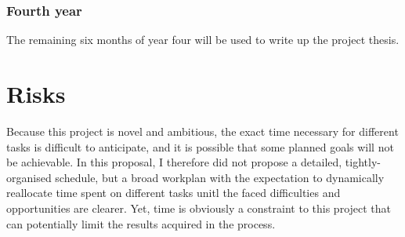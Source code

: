 \documentclass[a4paper,12pt,twoside]{report}
\begin{document}
\subsubsection{Fourth year}

The remaining six months of year four will be used to write up the project thesis. 










\section{Risks}

Because this project is novel and ambitious, the exact time necessary for different tasks is difficult to anticipate, and it is possible that some planned goals will not be achievable. In this proposal, I therefore did not propose a detailed, tightly-organised schedule, but a broad workplan with the expectation to dynamically reallocate time spent on different tasks unitl the faced difficulties and opportunities are clearer. Yet, time is obviously a constraint to this project that can potentially limit the results acquired in the process.
\end{document}
